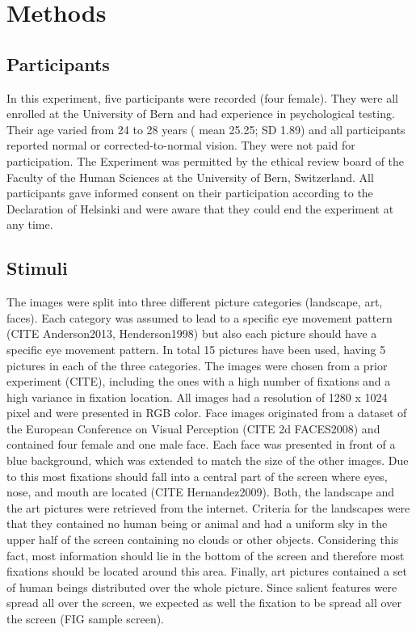 \documentclass[a4paper,man,natbib,floatsintext]{apa6}
\begin{document}
\section{Methods}

\subsection{Participants}
In this experiment, five participants were recorded (four female). They were all enrolled at the University of Bern and had experience in psychological testing. Their age varied from 24 to 28 years ( mean 25.25; SD 1.89) and all participants reported normal or corrected-to-normal vision. They were not paid for participation. The Experiment was permitted by the ethical review board of the Faculty of the Human Sciences at the University of Bern, Switzerland. All participants gave informed consent on their participation according to the Declaration of Helsinki and were aware that they could end the experiment at any time.\\

\subsection{Stimuli} 
The images were split into three different picture categories (landscape, art, faces). Each category was assumed to lead to a specific eye movement pattern (CITE Anderson2013, Henderson1998) but also each picture should have a specific eye movement pattern. In total 15 pictures have been used, having 5 pictures in each of the three categories. The images were chosen from a prior experiment (CITE), including the ones with a high number of fixations and a high variance in fixation location. All images had a resolution of 1280 x 1024 pixel and were presented in RGB color. Face images originated from a dataset of the European Conference on Visual Perception (CITE 2d FACES2008) and contained four female and one male face. Each face was presented in front of a blue background, which was extended to match the size of the other images. Due to this most fixations should fall into a central part of the screen where eyes, nose, and mouth are located (CITE Hernandez2009). Both, the landscape and the art pictures were retrieved from the internet. Criteria for the landscapes were that they contained no human being or animal and had a uniform sky in the upper half of the screen containing no clouds or other objects. Considering this fact, most information should lie in the bottom of the screen and therefore most fixations should be located around this area. Finally, art pictures contained a set of human beings distributed over the whole picture. Since salient features were spread all over the screen, we expected as well the fixation to be spread all over the screen (FIG sample screen). \\
\end{document}
